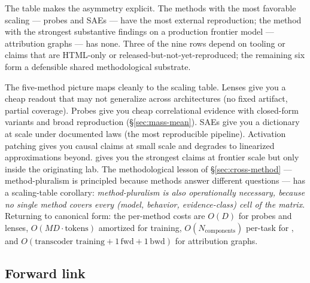The table makes the asymmetry explicit. The methods with the most
favorable scaling --- probes and SAEs --- have the most external
reproduction; the method with the strongest substantive findings on a
production frontier model --- attribution graphs --- has none. Three
of the nine rows depend on tooling or claims that are HTML-only or
released-but-not-yet-reproduced; the remaining six form a defensible
shared methodological substrate.

\begin{intuition}
The five-method picture maps cleanly to the scaling table. Lenses give
you a cheap readout that may not generalize across architectures (no
fixed artifact, partial coverage). Probes give you cheap
correlational evidence with closed-form variants and broad reproduction
(\S\ref{sec:mass-mean}). SAEs give you a  dictionary at scale
under documented laws (the most reproducible pipeline). Activation
patching gives you causal claims at small scale and degrades to
linearized approximations beyond.  gives you the
strongest claims at frontier scale but only inside the originating
lab. The methodological lesson of \S\ref{sec:cross-method} ---
method-pluralism is principled because methods answer different
questions --- has a scaling-table corollary: \emph{method-pluralism
is also operationally necessary, because no single method covers every
(model, behavior, evidence-class) cell of the matrix}. Returning to
canonical form: the per-method costs are $O(D)$ for probes and lenses,
$O(M D \cdot \text{tokens})$ amortized for  training,
$O(N_{\mathrm{components}})$ per-task for , and
$O(\text{transcoder training} + 1\,\text{fwd} + 1\,\text{bwd})$ for
attribution graphs.
\end{intuition}

\subsection{Forward link}
\label{sec:scaling-forward}

